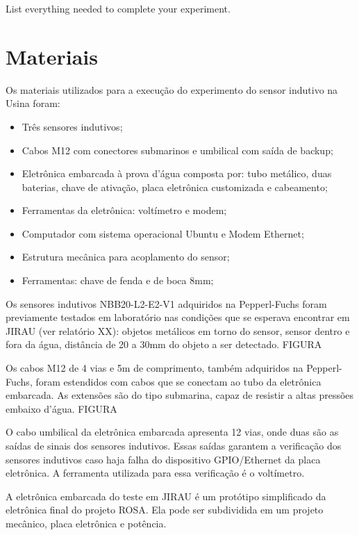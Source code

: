
List everything needed to complete your experiment.



\section{Materiais}
Os materiais utilizados para a execução do experimento do sensor indutivo na
Usina foram:
\begin{itemize}
  \item Três sensores indutivos;
  \item Cabos M12 com conectores submarinos e umbilical com saída de backup;
  \item Eletrônica embarcada à prova d'água composta por: tubo metálico, duas
  baterias, chave de ativação, placa eletrônica customizada e cabeamento;
  \item Ferramentas da eletrônica: voltímetro e modem;
  \item Computador com sistema operacional Ubuntu e Modem Ethernet;
  \item Estrutura mecânica para acoplamento do sensor; 
  \item Ferramentas: chave de fenda e de boca 8mm;
\end{itemize}
Os sensores indutivos NBB20-L2-E2-V1 adquiridos na Pepperl-Fuchs foram
previamente testados em laboratório nas condições que se esperava encontrar em JIRAU (ver relatório XX): objetos
metálicos em torno do sensor, sensor dentro e fora da água, distância de 20 a
30mm do objeto a ser detectado. FIGURA

Os cabos M12 de 4 vias e 5m de comprimento, também adquiridos na Pepperl-Fuchs,
foram estendidos com cabos que se conectam ao tubo da eletrônica embarcada. As
extensões são do tipo submarina, capaz de resistir a altas pressões embaixo
d'água. FIGURA

O cabo umbilical da eletrônica embarcada apresenta 12 vias, onde duas são as
saídas de sinais dos sensores indutivos. Essas saídas garantem a
verificação dos sensores indutivos caso haja falha do dispositivo GPIO/Ethernet
da placa eletrônica. A ferramenta utilizada para essa verificação é o
voltímetro.

A eletrônica embarcada do teste em JIRAU é um protótipo simplificado da
eletrônica final do projeto ROSA. Ela pode ser subdividida em um projeto
mecânico, placa eletrônica e potência. 

